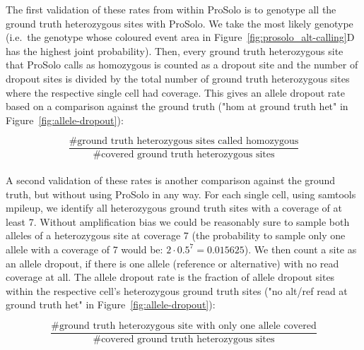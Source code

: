 \documentclass[authoryear,preprint,11pt]{scrartcl}
\begin{document}
The first validation of these rates from within ProSolo is to genotype all the ground truth heterozygous sites with ProSolo.
We take the most likely genotype (i.e.~the genotype whose coloured event area in Figure~\ref{fig:prosolo_alt-calling}D has the highest joint probability).
Then, every ground truth heterozygous site that ProSolo calls as homozygous is counted as a dropout site and the number of dropout sites is divided by the total number of ground truth heterozygous sites where the respective single cell had coverage.
This gives an allele dropout rate based on a comparison against the ground truth ("hom at ground truth het" in Figure~\ref{fig:allele-dropout}):

\begin{equation}
    \frac{\text{\# ground truth heterozygous sites called homozygous}}{\text{\# covered ground truth heterozygous sites}}
    \label{eq.hom-at-ground-truth-het-allele-dropout-rate}
\end{equation}\\

A second validation of these rates is another comparison against the ground truth, but without using ProSolo in any way.
For each single cell, using samtools mpileup, we identify all heterozygous ground truth sites with a coverage of at least 7.
Without amplification bias we could be reasonably sure to sample both alleles of a heterozygous site at coverage 7 (the probability to sample only one allele with a coverage of 7 would be: $2 \cdot 0.5^7 = 0.015625$).
We then count a site as an allele dropout, if there is one allele (reference or alternative) with no read coverage at all.
The allele dropout rate is the fraction of allele dropout sites within the respective cell's heterozygous ground truth sites ("no alt/ref read at ground truth het" in Figure~\ref{fig:allele-dropout}):

\begin{equation}
    \frac{\text{\# ground truth heterozygous site with only one allele covered}}{\text{\# covered ground truth heterozygous sites}}
    \label{eq.no-alt-ref-read-at-ground-truth-het-adr}
\end{equation}\\
\end{document}
